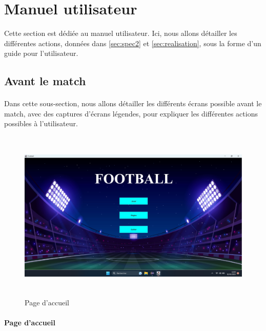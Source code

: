 \newpage
\section{Manuel utilisateur}
\label{sec:manuel}

\noindent Cette section est dédiée au manuel utilisateur. Ici, nous allons détailler les différentes actions, données dans \ref{sec:spec2} et \ref{sec:realisation}, sous la forme d'un guide pour l'utilisateur.

\subsection{Avant le match}

\paragraph{}
    Dans cette sous-section, nous allons détailler les différents écrans possible avant le match, avec des captures d'écrans légendes, pour expliquer les différentes actions possibles à l'utilisateur.

\begin{figure}[h]
\centering
\includegraphics[width=12.82cm, height=8.2cm]{images/Accueil.png}
\caption{Page d'accueil}
\label{fig:accueil}
\end{figure}

\paragraph{Page d'accueil}


